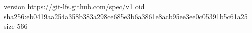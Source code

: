 version https://git-lfs.github.com/spec/v1
oid sha256:eb0419aa254a358b383a298ce685e3b6a3861e8acb95ee3ee0c05391b5c61a25
size 566
